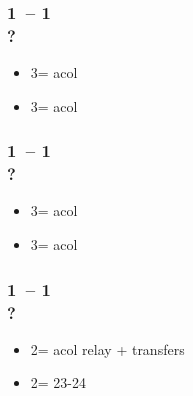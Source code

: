 \documentclass[12pt, a4paper]{report}
\begin{document}
\begin{bidpage}
\subsubsection*{1\clubs\ -- 1\hearts\\
                ?}
\begin{itemize}
    \item 3\clubs = acol \diams
    \item 3\diams = acol \spades
\end{itemize}
\end{bidpage}

\begin{bidpage}
\subsubsection*{1\clubs\ -- 1\spades\\
                ?}
\begin{itemize}
    \item 3\clubs = acol \diams
    \item 3\diams = acol \hearts
\end{itemize}
\end{bidpage}

\begin{bidpage}
\subsubsection*{1\clubs\ -- 1\nt\\
                ?}
\begin{itemize}
    \item 2\major = acol \major \then relay + transfers
    \item 2\nt = 23-24 \bal
\end{itemize}
\end{bidpage}
\end{document}
